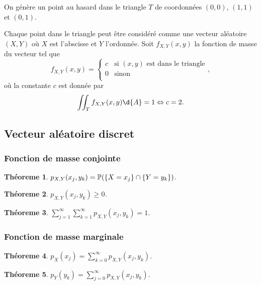 \documentclass[11pt]{article}
\renewcommand\P{%
	\ensuremath{%
		\mathbb{P}%
	}%
}%
\newtheorem{theoreme}{Théoreme}[section]
\begin{document}
\pagebreak
\begin{exemple}
	On génère un point au hasard dans le triangle $T$ de coordonnées $(0,0)$,
	$(1,1)$ et $(0,1)$.

	Chaque point dans le triangle peut être considéré comme une vecteur
	aléatoire $(X,Y)$ où $X$ est l'abscisse et $Y$ l'ordonnée. Soit
	$f_{X,Y}(x,y)$ la fonction de masse du vecteur tel que
	\begin{equation*}
		f_{X,Y}(x,y)=\left\{
			\begin{array}{rl}
				c&\text{si $(x,y)$ est dans le triangle}\\
				0&\text{sinon}\\
			\end{array}
		\right.,
	\end{equation*}
	où la constante $c$ est donnée par
	\begin{equation*}
		\iint_Tf_{X,Y}(x,y)\d{A}=1\Leftrightarrow c=2.
	\end{equation*}
\end{exemple}

\subsection{Vecteur aléatoire discret}
\subsubsection{Fonction de masse conjointe}
\begin{theoreme}
	$p_{X,Y}(x_j,y_k)=\P(\left\{X=x_j\right\}\cap\left\{Y=y_k\right\})$.
\end{theoreme}

\begin{theoreme}
	$p_{X,Y}(x_j,y_k)\geq 0$.
\end{theoreme}

\begin{theoreme}
	$\displaystyle\sum_{j=1}^\infty\displaystyle\sum_{k=1}^\infty
	p_{X,Y}(x_j,y_k)=1$.
\end{theoreme}

\subsubsection{Fonction de masse marginale}
\begin{theoreme}
	$p_X(x_j)=\displaystyle\sum_{k=0}^\infty p_{X,Y}(x_j,y_k)$.
\end{theoreme}

\begin{theoreme}
	$p_Y(y_k)=\displaystyle\sum_{j=0}^\infty p_{X,Y}(x_j,y_k)$.
\end{theoreme}
\end{document}
